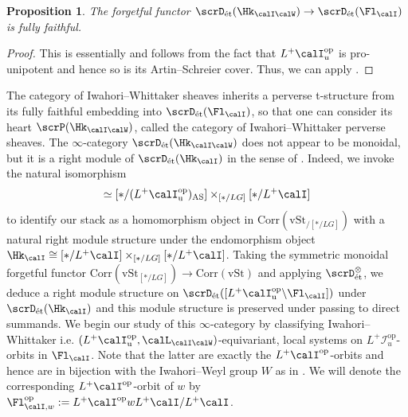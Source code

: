 \documentclass[10pt, reqno]{amsart}
\theoremstyle{plain}
\newtheorem{proposition}[theorem]{Proposition}
\theoremstyle{definition}
\numberwithin{equation}{section}
\begin{document}
\begin{proposition}
	The forgetful functor $\scrD_{\mathrm{\acute{e}t}}(\Hk_{\calI\calW})\to \scrD_{\mathrm{\acute{e}t}}(\Fl_{\calI})$ is fully faithful.
\end{proposition}
\begin{proof}
	This is essentially \cite[Proposition A.5]{ARW16} and follows from the fact that $L^+\calI_u^{\mathrm{op}}$ is pro-unipotent and hence so is its Artin--Schreier cover. Thus, we can apply \cite[Proposition VI.4.1]{FS21}.
\end{proof}
The category of Iwahori--Whittaker sheaves inherits a perverse t-structure from its fully faithful embedding into $\scrD_{\mathrm{\acute{e}t}}(\Fl_{\calI})$, so that one can consider its heart $\scrP(\Hk_{\calI\calW})$, called the category of Iwahori--Whittaker perverse sheaves. 		
The $\infty$-category $\scrD_{\mathrm{\acute{e}t}}(\Hk_{\calI\calW})$ does not appear to be monoidal, but it is a right module of $\scrD_{\mathrm{\acute{e}t}}(\Hk_{\calI})$ in the sense of \cite[Definition 4.2.1.13]{Lur17}. Indeed, we invoke the natural isomorphism
\begin{equation}
	[(L^+\calI_{\mathrm{u}}^{\mathrm{op}})_{\mathrm{AS}}\backslash \Fl_{ \calI}] \simeq [*/(L^+\calI_{\mathrm{u}}^{\mathrm{op}})_{\mathrm{AS}}]\times_{[*/LG]} [*/L^+\calI] 
\end{equation} to identify our stack as a homomorphism object in $\mathrm{Corr}(\mathrm{vSt}_{/[*/LG]})$ with a natural right module structure under the endomorphism object $\Hk_{\calI}\cong [*/L^+\calI]\times_{[*/LG]} [*/L^+\calI]$. Taking the symmetric monoidal forgetful functor $\mathrm{Corr}(\mathrm{vSt}_{[\ast/LG]})\to \mathrm{Corr}(\mathrm{vSt})$ and applying $\scrD_{\mathrm{\acute{e}t}}^{\otimes}$, we deduce a right module structure on $\scrD_{\mathrm{\acute{e}t}}([L^+\calI_{\mathrm{u}}^{\mathrm{op}}\backslash \Fl_{ \calI}])$ under $\scrD_{\mathrm{\acute{e}t}}(\Hk_{\calI})$ and this module structure is preserved under passing to direct summands.
We begin our study of this $\infty$-category by classifying Iwahori--Whittaker i.e. $(L^+\calI_{\mathrm{u}}^{\mathrm{op}},\calL_{\calI\calW})$-equivariant, local systems on $L^+\mathcal{I}^{\mathrm{op}}_u$-orbits in $\Fl_\calI$. Note that the latter are exactly the $L^+\calI^{\mathrm{op}}$-orbits and hence are in bijection with the Iwahori--Weyl group $W$ as in . We will denote the corresponding $L^+\calI^{\mathrm{op}}$-orbit of $w$ by $\Fl_{\calI,w}^{\mathrm{op}}:=L^+\calI^{\mathrm{op}}wL^+\calI/L^+\calI$.
\end{document}
